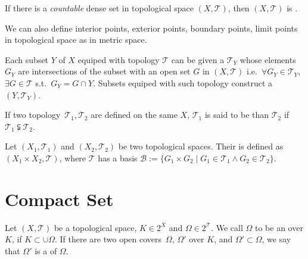 \documentclass[openany]{book}
\begin{document}
\begin{definition}[Separable]\label{definition: separable}
	If there is a \emph{countable} dense set in topological space $(X, \mathscr T)$, then $(X,\mathscr T)$ is .
\end{definition}

We can also define interior points, exterior points, boundary points, limit points in topological space as in metric space.

\begin{definition}\label{subspace (topology)}
	Each subset $Y$ of $X$ equiped with topology $\mathscr T$ can be given a  $\mathscr T_Y$ whose elements $G_Y$ are intersections of the subset with an open set $G$ in $(X, \mathscr T)$ i.e.\ $\forall G_Y \in \mathscr T_Y$, $\exists G \in \mathscr T$ s.t.\ $G_Y = G \cap Y$. 
	Subsets equiped with such topology construct a %
		~$(Y, \mathscr T_Y)$. 
\end{definition}

If two topology~$\mathscr T_1, \mathscr T_2$ are defined on the same $X$, $\mathscr T_1$ is said to be  than $\mathscr T_2$ if $\mathscr T_1 \subsetneqq \mathscr T_2$.

\begin{definition}\label{definition: direct product}
	Let $(X_1, \mathscr T_1)$ and $(X_2, \mathscr T_2)$ be two topological spaces. 
	Their  is defined as $(X_1 \times X_2, \mathscr T)$, where $\mathscr T$ has a basis $\mathscr B := \{ G_1 \times G_2 \mid G_1 \in \mathscr T_1 \wedge G_2 \in \mathscr T_2\}$.
\end{definition}

\section{Compact Set}

\begin{definition}\label{definition: open cover}
	Let $(X, \mathscr T)$ be a topological space, $K \in 2^X$ and $\varOmega \in 2^\mathscr T$. We call $\varOmega$ to be an  over $K$, if $K \subset \cup \varOmega$. 
	If there are two open covers~$\varOmega$, $\varOmega'$ over $K$, and $\varOmega' \subset \varOmega$, we say that $\varOmega'$ is a  of $\varOmega$.
\end{definition}
\end{document}

